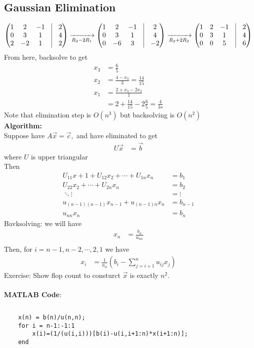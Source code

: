 \documentclass[11pt,oneside]{book}
\theoremstyle{break}
\theoremstyle{break}
\newcommand{\exercise}{\color{cyan}Exercise: \color{black}}
\begin{document}
\subsection[Gaussian Elimination]{Gaussian Elimination}\begin{align*}
\begin{pmatrix}
1&2&-1&\vline &2\\
0&3&1&\vline&4\\
2&-2&1&\vline&2
\end{pmatrix}\xrightarrow[R_3-2R_1]{}\begin{pmatrix}
1&2&-1&\vline &2\\
0&3&1&\vline&4\\
0&-6&3&\vline&-2
\end{pmatrix}\xrightarrow[R_3+2R_3]{}\begin{pmatrix}
1&2&-1&\vline &2\\
0&3&1&\vline&4\\
0&0&5&\vline&6
\end{pmatrix}
\end{align*}
From here, backsolve to get \begin{align*}
x_3&=\frac{6}{5}\\
x_2&=\frac{4-x_3}{3}=\frac{14}{15}\\
x_1&=\frac{2+x_3-2x_2}{1}\\
&=2+\frac{14}{15}-2\frac{6}{5}=\frac{4}{3s}
\end{align*}
Note that elimination step is $O(n^3)$ but backsolving is $O(n^2)$\\
\textbf{Algorithm:}\\
Suppose have $A\vec{x}=\vec{c},$ and have eliminated to get \begin{align*}
U\vec{x}&=\vec{b}
\end{align*}
where $U$ is upper triangular\\
 Then \begin{align*}
U_{11}x+1+U_{12}x_2+\cdots +U_{1n}x_n&=b_1\\
U_{22}x_2+\cdots+U_{2n}x_n&=b_2\\
\ddots\vdots&=\vdots\\
u_{(n-1)(n-1)}x_{n-1}+u_{(n-1)n}x_n&=b_{n-1}\\
u_{nn}x_n&=b_n
\end{align*}
Bavksolving: we will have \begin{align*}
x_n&=\frac{b_n}{u_{nn}}\\
\end{align*}
Then, for $i=n-1,n-2,\cdots,2,1$ we have \begin{align*}
x_i&=\frac{1}{u_{ii}}\left(b_i-\sum_{j=i+1}^nu_{ij}x_j \right)
\end{align*}
\exercise Show flop count to consturct $\vec{x}$ is exactly $n^2$.\\
\hfill\\
\textbf{MATLAB Code}:\begin{lstlisting}
\end{lstlisting}  \begin{lstlisting}[frame=single]
    % Backsolving
    x(n) = b(n)/u(n,n);
    for i = n-1:-1:1
    	x(i)=(1/(u(i,i)))[b(i)-u(i,i+1:n)*x(i+1:n)];
    end
  \end{lstlisting}
\end{document}
